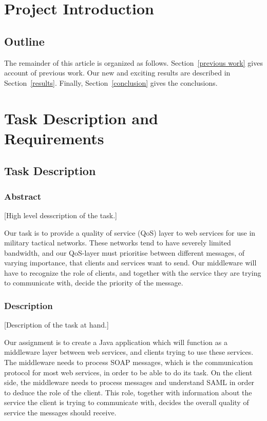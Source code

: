 \documentclass[12pt]{article}
\begin{document}
\newpage
\begin{abstract}\label{abstract}
This is the paper's abstract \ldots
\end{abstract}

\tableofcontents
\listoffigures
\listoftables
\newpage

\section{Project Introduction}\label{intoduction}
\subsection{Outline}\label{outline} 
The remainder of this article is organized as follows. Section~\ref{previous work} gives account of previous work. Our new and exciting results are described in Section~\ref{results}. Finally, Section~\ref{conclusion} gives the conclusions.

\section{Task Description and Requirements}\label{taskdescreq}
    \subsection{Task Description}\label{taskdef}
        \subsubsection{Abstract}\label{taskabst} 
        [High level desscription of the task.]
        
        Our task is to provide a quality of service (QoS) layer to web services for use in military tactical networks. These networks tend to have severely limited bandwidth, and our QoS-layer must prioritise between different messages, of varying importance, that clients and services want to send. Our middleware will have to recognize the role of clients, and together with the service they are trying to communicate with, decide the priority of the message.
        \subsubsection{Description}\label{taskdesc} 
        [Description of the task at hand.]
        
        Our assignment is to create a Java application which will function as a middleware layer between web services, and clients trying to use these services. The middleware needs to process SOAP messages, which is the communication protocol for most web services, in order to be able to do its task. On the client side, the middleware needs to process messages and understand SAML in order to deduce the role of the client. This role, together with information about the service the client is trying to communicate with, decides the overall quality of service the messages should receive. 
\end{document}
